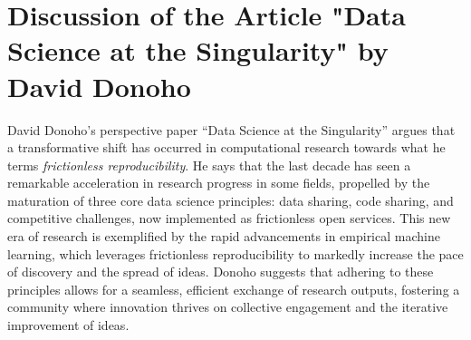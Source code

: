 \documentclass[]{hdsr}
\begin{document}
\section{Discussion of the Article "Data Science at the Singularity" by David Donoho}
\label{intro}
David Donoho's perspective paper ``Data Science at the Singularity'' argues that a transformative shift has occurred in computational research towards what he terms \emph{frictionless reproducibility}. He says that the last decade has seen a remarkable acceleration in research progress in some fields, propelled by the maturation of three core data science principles: data sharing, code sharing, and competitive challenges, now implemented as frictionless open services. This new era of research is exemplified by the rapid advancements in empirical machine learning, which leverages frictionless reproducibility to markedly increase the pace of discovery and the spread of ideas. Donoho suggests that adhering to these principles allows for a seamless, efficient exchange of research outputs, fostering a community where innovation thrives on collective engagement and the iterative improvement of ideas.
\end{document}
